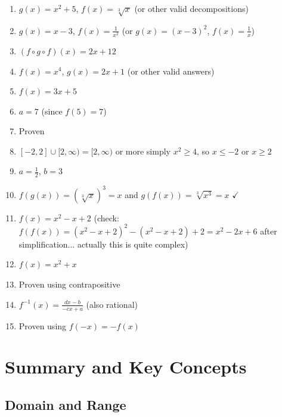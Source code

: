 \documentclass[12pt,a4paper]{article}
\begin{document}
\begin{enumerate}
    \item $g(x) = x^2 + 5$, $f(x) = \sqrt[3]{x}$ (or other valid decompositions)
    
    \item $g(x) = x - 3$, $f(x) = \frac{1}{x^2}$ (or $g(x) = (x-3)^2$, $f(x) = \frac{1}{x}$)
    
    \item $(f \circ g \circ f)(x) = 2x + 12$
    
    \item $f(x) = x^4$, $g(x) = 2x + 1$ (or other valid answers)
    
    \item $f(x) = 3x + 5$
    
    \item $a = 7$ (since $f(5) = 7$)
    
    \item Proven
    
    \item $[-2, 2] \cup [2, \infty) = [2, \infty)$ or more simply $x^2 \geq 4$, so $x \leq -2$ or $x \geq 2$
    
    \item $a = \frac{1}{2}$, $b = 3$
    
    \item $f(g(x)) = (\sqrt[3]{x})^3 = x$ and $g(f(x)) = \sqrt[3]{x^3} = x$ $\checkmark$
    
    \item $f(x) = x^2 - x + 2$ (check: $f(f(x)) = (x^2-x+2)^2 - (x^2-x+2) + 2 = x^2 - 2x + 6$ after simplification... actually this is quite complex)
    
    \item $f(x) = x^2 + x$
    
    \item Proven using contrapositive
    
    \item $f^{-1}(x) = \frac{dx-b}{-cx+a}$ (also rational)
    
    \item Proven using $f(-x) = -f(x)$
\end{enumerate}

\section{Summary and Key Concepts}

\subsection{Domain and Range}
\end{document}
